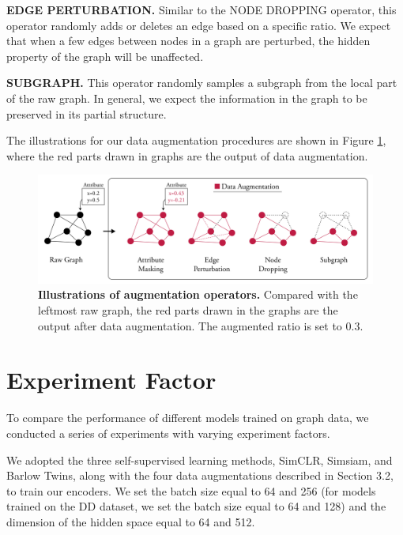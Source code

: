 \textbf{\uppercase{edge perturbation.}} Similar to the \uppercase{node dropping} operator, this operator randomly adds or deletes an edge based on a specific ratio. We expect that when a few edges between nodes in a graph are perturbed, the hidden property of the graph will be unaffected. 

\textbf{\uppercase{subgraph.}} This operator randomly samples a subgraph from the local part of the raw graph. In general, we expect the information in the graph to be preserved in its partial structure. 

The illustrations for our data augmentation procedures are shown in Figure \ref{fig:aug}, where the red parts drawn in graphs are the output of data augmentation.


\begin{figure}[!htbp]
\centering
\includegraphics[width=1\textwidth]{./figures/data_augmetation_aka.png}
\vspace{0.5cm}
\caption[Illustrations of augmentation operators]{\textbf{Illustrations of augmentation operators.} Compared with the leftmost raw graph, the red parts drawn in the graphs are the output after data augmentation. The augmented ratio is set to 0.3.}
\label{fig:aug}
\end{figure}





\section{Experiment Factor}

To compare the performance of different models trained on graph data, we conducted a series of experiments with varying experiment factors.

We adopted the three self-supervised learning methods, SimCLR, Simsiam, and Barlow Twins, along with the four data augmentations described in Section 3.2, to train our encoders. We set the batch size equal to 64 and 256 (for models trained on the DD dataset, we set the batch size equal to 64 and 128) and the dimension of the hidden space equal to 64 and 512. 

